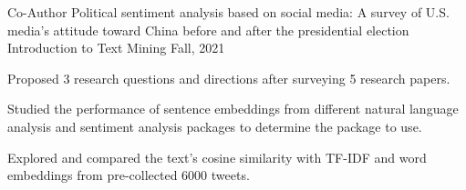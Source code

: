\begin{cventries}
  \cventry
  {Co-Author}
  {Political sentiment analysis based on social media:
  A survey of U.S. media's attitude toward China before and after
  the presidential election}
  {Introduction to Text Mining}
  {Fall, 2021}
  {
      \begin{cvitems}
      \item Proposed 3 research questions and directions after surveying 5 research
          papers.
      \item Studied the performance of sentence embeddings from different 
          natural language analysis and sentiment analysis packages
          to determine the package to use.
      \item Explored and compared the text's cosine similarity with TF-IDF
          and word embeddings from pre-collected 6000 tweets.
      \end{cvitems}
  }

\end{cventries}
